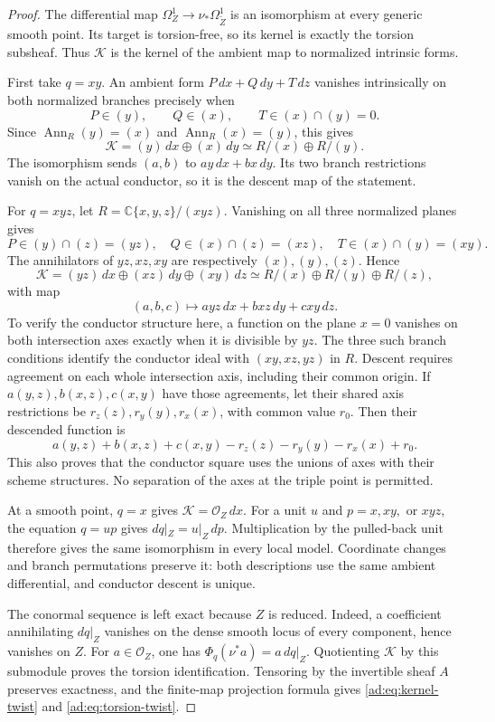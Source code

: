 \documentclass[11pt]{article}
\numberwithin{equation}{section}
\begin{document}
\begin{proof}
The differential map
$\Omega_Z^1\to\nu_*\Omega_{\widetilde Z}^1$ is an isomorphism
at every generic smooth point. Its target is torsion-free, so its
kernel is exactly the torsion subsheaf. Thus $\mathcal K$ is the
kernel of the ambient map to normalized intrinsic forms.

First take $q=xy$. An ambient form
$P\,dx+Q\,dy+T\,dz$ vanishes intrinsically on both normalized
branches precisely when
\[
 P\in(y),\qquad Q\in(x),\qquad T\in(x)\cap(y)=0.
\]
Since $\operatorname{Ann}_R(y)=(x)$ and
$\operatorname{Ann}_R(x)=(y)$, this gives
\[
 \mathcal K=(y)\,dx\oplus(x)\,dy
 \simeq R/(x)\oplus R/(y).
\]
The isomorphism sends $(a,b)$ to $a y\,dx+b x\,dy$.
Its two branch restrictions vanish on the actual conductor, so
it is the descent map of the statement.

For $q=xyz$, let $R=\mathbb C\{x,y,z\}/(xyz)$.
Vanishing on all three normalized planes gives
\[
 P\in(y)\cap(z)=(yz),\quad
 Q\in(x)\cap(z)=(xz),\quad
 T\in(x)\cap(y)=(xy).
\]
The annihilators of $yz,xz,xy$ are respectively $(x),(y),(z)$.
Hence
\[
 \mathcal K=(yz)\,dx\oplus(xz)\,dy\oplus(xy)\,dz
 \simeq R/(x)\oplus R/(y)\oplus R/(z),
\]
with map
\[
 (a,b,c)\longmapsto a yz\,dx+b xz\,dy+c xy\,dz.
\]
To verify the conductor structure here, a function on the plane
$x=0$ vanishes on both intersection axes exactly when it is
divisible by $yz$. The three such branch conditions identify the
conductor ideal with $(xy,xz,yz)$ in $R$. Descent requires agreement
on each whole intersection axis, including their common origin.
If $a(y,z),b(x,z),c(x,y)$ have those agreements, let their shared
axis restrictions be $r_z(z),r_y(y),r_x(x)$, with common value $r_0$.
Then their descended function is
\[
 a(y,z)+b(x,z)+c(x,y)-r_z(z)-r_y(y)-r_x(x)+r_0.
\]
This also proves that the conductor square uses the unions of axes
with their scheme structures. No separation of the axes at the
triple point is permitted.

At a smooth point, $q=x$ gives $\mathcal K=\mathcal O_Z\,dx$.
For a unit $u$ and $p=x,xy,$ or $xyz$, the equation $q=up$ gives
$dq|_Z=u|_Z\,dp$. Multiplication by the pulled-back unit therefore
gives the same isomorphism in every local model. Coordinate changes
and branch permutations preserve it: both descriptions use the
same ambient differential, and conductor descent is unique.

The conormal sequence is left exact because $Z$ is reduced.
Indeed, a coefficient annihilating $dq|_Z$ vanishes on the dense
smooth locus of every component, hence vanishes on $Z$.
For $a\in\mathcal O_Z$, one has $\Phi_q(\nu^*a)=a\,dq|_Z$.
Quotienting $\mathcal K$ by this submodule proves the torsion
identification. Tensoring by the invertible sheaf $A$ preserves
exactness, and the finite-map projection formula gives
\eqref{ad:eq:kernel-twist} and \eqref{ad:eq:torsion-twist}.
\end{proof}
\end{document}
